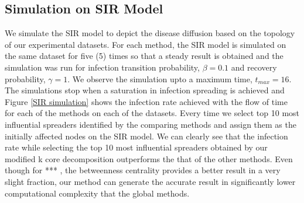 \documentclass[sigconf]{acmart}
\begin{document}
\subsection{Simulation on SIR Model}
We simulate the SIR model to depict the disease diffusion based on the topology of our experimental datasets. For each method, the SIR model is simulated on the same dataset for five (5) times so that a steady result is obtained and the simulation was run for infection transition probability, $\beta = 0.1$ and recovery probability, $\gamma = 1$. We observe the simulation upto a maximum time, $t_{max} = 16$. The simulations stop when a saturation in infection spreading is achieved and Figure \ref{SIR simulation} shows the infection rate achieved with the flow of time for each of the methods on each of the datasets. Every time we select top 10 most influential spreaders identified by the comparing methods and assign them as the initially affected nodes on the SIR model. We can clearly see that the infection rate while selecting the top 10 most influential spreaders obtained by our modified k core decomposition outperforms the that of the other methods. Even though for *** , the betweenness centrality provides a better result in a very slight fraction, our method can generate  the accurate result in significantly lower computational complexity that the global methods.    
\end{document}
